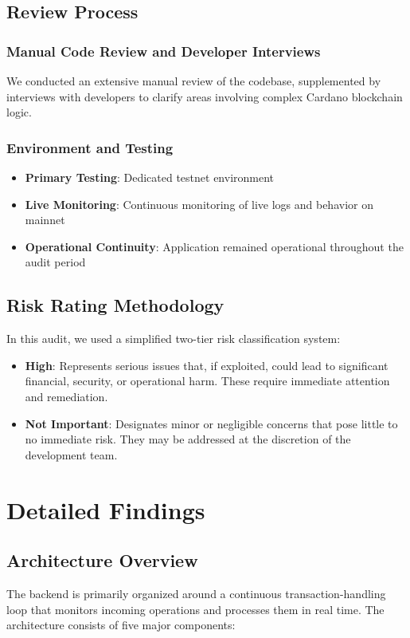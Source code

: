 \documentclass[11pt,a4paper]{article}
\begin{document}
\subsection{Review Process}
\subsubsection{Manual Code Review and Developer Interviews}
We conducted an extensive manual review of the codebase, supplemented by interviews with developers to clarify areas involving complex Cardano blockchain logic.

\subsubsection{Environment and Testing}
\begin{itemize}
    \item \textbf{Primary Testing}: Dedicated testnet environment
    \item \textbf{Live Monitoring}: Continuous monitoring of live logs and behavior on mainnet
    \item \textbf{Operational Continuity}: Application remained operational throughout the audit period
\end{itemize}

\subsection{Risk Rating Methodology}
In this audit, we used a simplified two-tier risk classification system:

\begin{itemize}
    \item \textbf{\textcolor{danzoRed}{High}}: Represents serious issues that, if exploited, could lead to significant financial, security, or operational harm. These require immediate attention and remediation.
    \item \textbf{\textcolor{danzoGray}{Not Important}}: Designates minor or negligible concerns that pose little to no immediate risk. They may be addressed at the discretion of the development team.
\end{itemize}

\section{Detailed Findings}

\subsection{Architecture Overview}
The backend is primarily organized around a continuous transaction-handling loop that monitors incoming operations and processes them in real time. The architecture consists of five major components:
\end{document}
